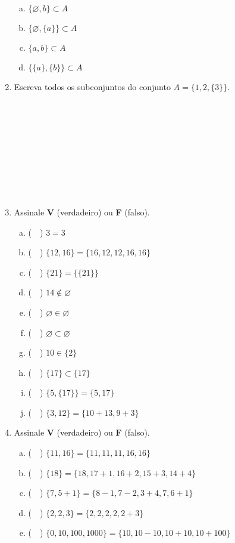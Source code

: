 \documentclass[a4paper,14pt]{article}
\begin{document}
\begin{multicols}{2}
\begin{enumerate}
\begin{enumerate}[a)]
				\item $\{\varnothing, b\} \subset A$
				\item $\{\varnothing, \{a\}\} \subset A$
				\item $\{a, b\} \subset A$
				\item $\{\{a\}, \{b\}\} \subset A$
			\end{enumerate}
			\item Escreva todos os subconjuntos do conjunto $A = \{1, 2, \{3\}\}$. \\\\\\\\\\\\\\\\\\\\
			\item Assinale \textbf{V} (verdadeiro) ou \textbf{F} (falso).
			\begin{enumerate}[a)]
				\item (~~) $3 = 3$
				\item (~~) $\{12, 16\} = \{16, 12, 12, 16, 16\}$
				\item (~~) $\{21\} = \{\{21\}\}$
				\item (~~) $14 \not\in \varnothing$
				\item (~~) $\varnothing \in \varnothing$
				\item (~~) $\varnothing \subset \varnothing$
				\item (~~) $10 \in \{2\}$
				\item (~~) $\{17\} \subset \{17\}$
				\item (~~) $\{5, \{17\}\} = \{5, 17\}$
				\item (~~) $\{3, 12\} = \{10 + 13, 9 + 3\}$
			\end{enumerate}
			\item Assinale \textbf{V} (verdadeiro) ou \textbf{F} (falso).
			\begin{enumerate}[a)]
				\item (~~) $\{11, 16\} = \{11, 11, 11, 16, 16\}$
				\item (~~) $\{18\} = \{18, 17 + 1, 16 + 2, 15 + 3, 14 + 4\}$
				\item (~~) $\{7, 5 + 1\} = \{8 - 1, 7 - 2, 3 + 4, 7, 6 + 1\}$
				\item (~~) $\{2, 2, 3\} = \{2, 2, 2, 2, 2 + 3\}$
				\item (~~) $\{0, 10, 100, 1 000\} = \{10, 10 - 10, 10 + 10, 10 + 100\}$

\end{enumerate}
\end{enumerate}
\end{multicols}
\end{document}
